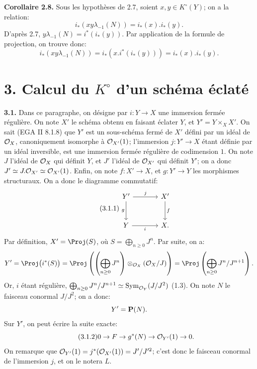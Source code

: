\textbf{Corollaire 2.8.} Sous les hypothèses de 2.7, soient \(x,y\in K^\circ(Y)\); on a la relation:
\begin{equation}\tag{2.8.1}
i_*(xy\lambda_{-1}(N))=i_*(x).i_*(y).
\end{equation}
D'après 2.7, \(y\lambda_{-1}(N)=i^*(i_*(y))\). Par application de la formule de projection, on trouve donc:
\[
i_*(xy\lambda_{-1}(N))
=i_*(x.i^*(i_*(y)))
=i_*(x).i_*(y).
\]

\section*{3. Calcul du \texorpdfstring{$K^\circ$}{K} d'un schéma éclaté}

\textbf{3.1.} Dans ce paragraphe, on désigne par \(i:Y\to X\) une immersion fermée régulière. On note \(X'\) le schéma obtenu en faisant éclater \(Y\), et \(Y'=Y\times_X X'\). On
sait (EGA II 8.1.8) que \(Y'\) est un sous-schéma fermé de \(X'\) défini par un idéal de \(\mathcal O_X\), canoniquement isomorphe à \(\mathcal O_{X'}(1)\); l'immersion \(j:Y'\to X\) étant définie par un idéal inversible, est une immersion fermée régulière de codimension \(1\). On note \(J\) l'idéal de \(\mathcal O_X\) qui définit \(Y\), et \(J'\) l'idéal de \(\mathcal O_{X'}\) qui définit \(Y'\); on a donc \(J'\simeq J.\mathcal O_{X'}\simeq\mathcal O_{X'}(1)\). Enfin, on note \(f:X'\to X\), et \(g:Y'\to Y\) les morphismes structuraux. On a donc le diagramme commutatif:
\begin{equation}\tag{3.1.1}
\begin{tikzcd}[column sep=large,row sep=large]
Y' \arrow[r,"j"] \arrow[d,"g"'] & X' \arrow[d,"f"]\\
Y \arrow[r,"i"'] & X.
\end{tikzcd}
\end{equation}
Par définition, \(X'=\Proj(S)\), où \(S=\bigoplus_{n\ge0}J^n\). Par suite, on a:
\[
Y'=\Proj\bigl(i^*(S)\bigr)
=\Proj\left(\left(\bigoplus_{n\ge0}J^n\right)\otimes_{\cO_X}(\cO_X/J)\right)
=\Proj\left(\bigoplus_{n\ge0}J^n/J^{n+1}\right).
\]
Or, \(i\) étant régulière, \(\bigoplus_{n\ge0}J^n/J^{n+1}\simeq \operatorname{Sym}_{\mathcal O_Y}(J/J^2)\) (1.3). On note \(N\) le faisceau conormal \(J/J^2\); on a donc:
\[
Y'=\mathbf P(N).
\]
Sur \(Y'\), on peut écrire la suite exacte:
\begin{equation}\tag{3.1.2}
0\to F\to g^*(N)\to\mathcal O_{Y'}(1)\to0.
\end{equation}
On remarque que \(\mathcal O_{Y'}(1)=j^*(\mathcal O_{X'}(1))=J'/J'^2\); c'est donc le faisceau conormal de l'immersion \(j\), et on le notera \(L\).

